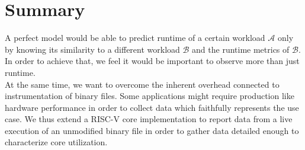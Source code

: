 \documentclass[../bachelor_paper.tex]{subfiles}
\begin{document}
\section{Summary} %
	\label{ch:theo/simi/summ}
A perfect model would be able to predict runtime of a certain workload $\mathcal{A}$ only by knowing its similarity to a different workload $\mathcal{B}$ and the runtime metrics of $\mathcal{B}$. In order to achieve that, we feel it would be important to observe more than just runtime.\\
At the same time, we want to overcome the inherent overhead connected to instrumentation of binary files. Some applications might require production like hardware performance in order to collect data which faithfully represents the use case. We thus extend a RISC-V core implementation to report data from a live execution of an unmodified binary file in order to gather data detailed enough to characterize core utilization.



\isstandalone



\fi
\end{document}

